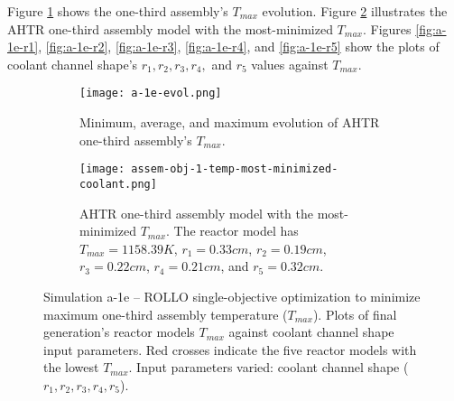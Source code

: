 Figure \ref{fig:a-1e-evol} shows the one-third assembly's $T_{max}$ evolution.
Figure \ref{fig:assem-obj-1-temp-most-minimized-coolant} illustrates the \gls{AHTR} 
one-third assembly model with the most-minimized $T_{max}$. 
Figures \ref{fig:a-1e-r1}, \ref{fig:a-1e-r2}, \ref{fig:a-1e-r3}, \ref{fig:a-1e-r4}, 
and \ref{fig:a-1e-r5} show the plots of coolant channel shape's 
$r_1, r_2, r_3, r_4,$ and $r_5$ values against $T_{max}$. 
\begin{figure}[htbp!]
    \begin{subfigure}{\textwidth}
        \centering
        \texttt{[image: a-1e-evol.png]}
        \caption{Minimum, average, and maximum evolution of AHTR one-third assembly's 
        $T_{max}$.}
        \label{fig:a-1e-evol} 
    \end{subfigure}
    \begin{subfigure}{\textwidth}
        \centering
        \texttt{[image: assem-obj-1-temp-most-minimized-coolant.png]}
        \caption{\gls{AHTR} one-third assembly model with the most-minimized $T_{max}$. 
        The reactor model has $T_{max} = 1158.39K$, $r_1 = 0.33cm$, $r_{2} = 0.19cm$,
        $r_3 = 0.22cm$, $r_{4} = 0.21cm$, and $r_{5} = 0.32cm$.}
        \label{fig:assem-obj-1-temp-most-minimized-coolant} 
    \end{subfigure}
    \caption{Simulation a-1e -- ROLLO single-objective optimization to minimize 
    maximum one-third assembly temperature ($T_{max}$). 
    Plots of final generation's reactor models $T_{max}$ against 
    coolant channel shape input parameters. 
    Red crosses indicate the five reactor models with the lowest $T_{max}$.
    Input parameters varied: coolant channel shape ($r_1, r_2, r_3, r_4, r_5$).}
    \label{fig:a-1e}
\end{figure}
